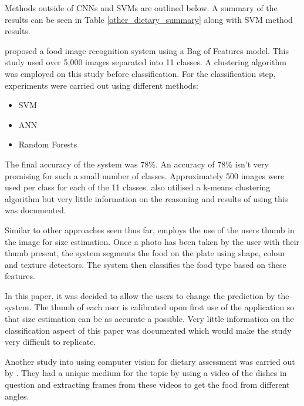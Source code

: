 Methods outside of CNNs and SVMs are outlined below.
A summary of the results can be seen in Table \ref{other_dietary_summary} along with SVM method results.

\parencite{LSL_2015} proposed a food image recognition system using a Bag of Features model.
This study used over 5,000 images separated into 11 classes.
A clustering algorithm was employed on this study before classification.
For the classification step, experiments were carried out using different methods:
\begin{itemize}
	\item{SVM}
	\item{ANN}
	\item{Random Forests}
\end{itemize}

The final accuracy of the system was 78\%.
An accuracy of 78\% isn't very promising for such a small number of classes.
Approximately 500 images were used per class for each of the 11 classes.
\parencite{LSL_2015} also utilised a k-means clustering algorithm but very little information on the reasoning and results of using this was documented.


Similar to other approaches seen thus far, \parencite{personalAssistive} employs the use of the users thumb in the image for size estimation.
Once a photo has been taken by the user with their thumb present, the system segments the food on the plate using shape, colour and texture detectors.
The system then classifies the food type based on these features.

In this paper, it was decided to allow the users to change the prediction by the system.
The thumb of each user is calibrated upon first use of the application so that size estimation can be as accurate a possible.
Very little information on the classification aspect of this paper was documented which would make the study very difficult to replicate. 

Another study into using computer vision for dietary assessment was carried out by \parencite{chen2010toward}. They had a unique medium for the topic by using a video of the dishes in question and extracting frames from these videos to get the food from different angles.

